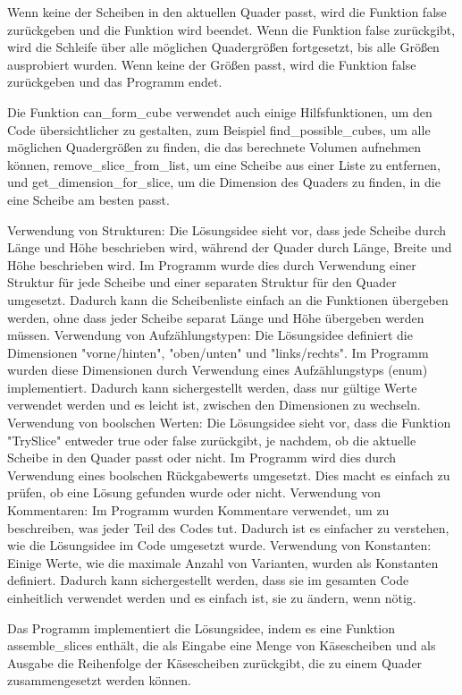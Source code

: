 \documentclass[a4paper,10pt,ngerman]{scrartcl}
\begin{document}
    Wenn keine der Scheiben in den aktuellen Quader passt, wird die Funktion false zurückgeben und die Funktion wird beendet.
    Wenn die Funktion false zurückgibt, wird die Schleife über alle möglichen Quadergrößen fortgesetzt, bis alle Größen ausprobiert wurden.
    Wenn keine der Größen passt, wird die Funktion false zurückgeben und das Programm endet.

    Die Funktion can\_form\_cube verwendet auch einige Hilfsfunktionen, um den Code übersichtlicher zu gestalten,
    zum Beispiel find\_possible\_cubes, um alle möglichen Quadergrößen zu finden, die das berechnete Volumen aufnehmen können, remove\_slice\_from\_list,
    um eine Scheibe aus einer Liste zu entfernen, und get\_dimension\_for\_slice, um die Dimension des Quaders zu finden, in die eine Scheibe am besten passt.

    Verwendung von Strukturen: Die Lösungsidee sieht vor, dass jede Scheibe durch Länge und Höhe beschrieben wird, während der Quader durch Länge, Breite und Höhe beschrieben wird.
    Im Programm wurde dies durch Verwendung einer Struktur für jede Scheibe und einer separaten Struktur für den Quader umgesetzt.
    Dadurch kann die Scheibenliste einfach an die Funktionen übergeben werden, ohne dass jeder Scheibe separat Länge und Höhe übergeben werden müssen.
    Verwendung von Aufzählungstypen: Die Lösungsidee definiert die Dimensionen "vorne/hinten", "oben/unten" und "links/rechts".
    Im Programm wurden diese Dimensionen durch Verwendung eines Aufzählungstyps (enum) implementiert.
    Dadurch kann sichergestellt werden, dass nur gültige Werte verwendet werden und es leicht ist, zwischen den Dimensionen zu wechseln.
    Verwendung von boolschen Werten: Die Lösungsidee sieht vor, dass die Funktion "TrySlice" entweder true oder false zurückgibt, je nachdem, ob die aktuelle Scheibe in den Quader passt oder nicht.
    Im Programm wird dies durch Verwendung eines boolschen Rückgabewerts umgesetzt.
    Dies macht es einfach zu prüfen, ob eine Lösung gefunden wurde oder nicht.
    Verwendung von Kommentaren: Im Programm wurden Kommentare verwendet, um zu beschreiben, was jeder Teil des Codes tut.
    Dadurch ist es einfacher zu verstehen, wie die Lösungsidee im Code umgesetzt wurde.
    Verwendung von Konstanten: Einige Werte, wie die maximale Anzahl von Varianten, wurden als Konstanten definiert.
    Dadurch kann sichergestellt werden, dass sie im gesamten Code einheitlich verwendet werden und es einfach ist, sie zu ändern, wenn nötig.

    Das Programm implementiert die Lösungsidee, indem es eine Funktion assemble\_slices enthält, die als Eingabe eine Menge von Käsescheiben und als Ausgabe die Reihenfolge der Käsescheiben zurückgibt, die zu einem Quader zusammengesetzt werden können.
\end{document}
